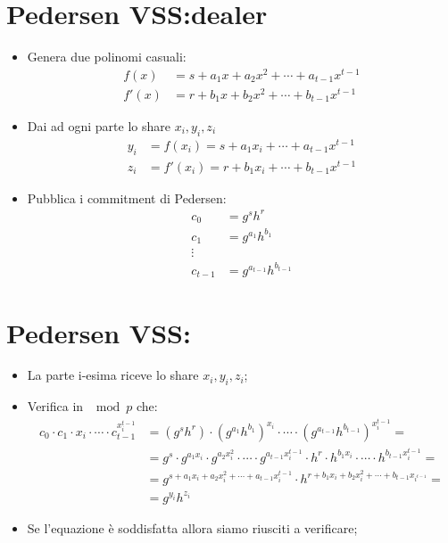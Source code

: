 \documentclass{book}
\begin{document}
\section{Pedersen VSS:dealer}
\begin{itemize}
	\item Genera due polinomi casuali:\begin{align*}
		      f(x)  & =s+a_{1}x+a_{2}x^2+\cdots +a_{t-1}x^{t-1} \\
		      f'(x) & =r+b_{1}x+b_{2}x^2+\cdots +b_{t-1}x^{t-1}
	      \end{align*}
	\item Dai ad ogni parte lo share \(x_{i},y_{i},z_{i}\)
	      \begin{align*}
		      y_{i} & =f(x_{i})=s+a_{1}x_{i}+\cdots +a_{t-1}x^{t-1}  \\
		      z_{i} & =f'(x_{i})=r+b_{1}x_{i}+\cdots +b_{t-1}x^{t-1}
	      \end{align*}
	\item Pubblica i commitment di Pedersen:\begin{align*}
		      c_{0}   & =g^{s}h^r               \\
		      c_{1}   & =g^{a_{1}}h^{b_{1}}     \\
		      \vdots                            \\
		      c_{t-1} & =g^{a_{t-1}}h^{b_{t-1}}
	      \end{align*}
\end{itemize}
\section{Pedersen VSS:\@verifier}
\begin{itemize}
	\item La parte i-esima riceve lo share \(x_{i},y_{i},z_{i}\);
	\item Verifica in \(\mod{p}\) che:\begin{align*}
		      c_{0}\cdot c_{1}\cdot x_{i}\cdot \cdots \cdot c_{t-1}^{x_{i}^{t-1}} & ={(g^{s}h^{r})}\cdot {(g^{a_{1}}h^{b_{1}})}^{x_{i}}\cdot\cdots\cdot {(g^{a_{t-1}}h^{b_{t-1}})}^{x_{i}^{t-1}}=                                                  \\
		                                                                          & =g^{s}\cdot g^{a_{1}x_{i}}\cdot g^{a_{2}x_{i}^2}\cdot\cdots\cdot g^{a_{t-1}x_{i}^{t-1}}\cdot h^{r}\cdot h^{b_{1}x_{i}}\cdot\cdots\cdot h^{b_{t-1}x_{i}^{t-1}}= \\
		                                                                          & =g^{s+a_{1}x_{i}+a_{2}x_{i}^2+\cdots+ a_{t-1}x_{i}^{t-1}}\cdot h^{r+b_{1}x_{i}+b_{2}x_{i}^2+\cdots+b_{t-1}x_{i^{t-1}}}=                                        \\
		                                                                          & =g^{y_{i}}h^{z_{i}}
	      \end{align*}
	\item Se l'equazione è soddisfatta allora siamo riusciti a verificare;
\end{itemize}
\newpage
\end{document}
